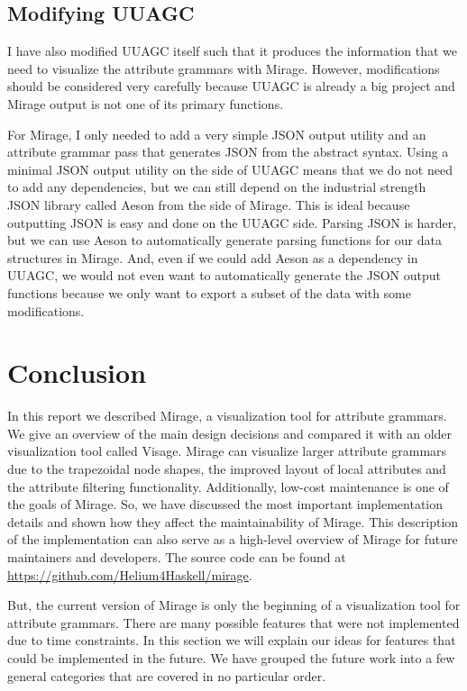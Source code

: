 \documentclass[11pt]{article}
\begin{document}
\subsection{Modifying UUAGC}

I have also modified UUAGC itself such that it produces the information that we need to visualize the attribute grammars with Mirage.
However, modifications should be considered very carefully because UUAGC is already a big project and Mirage output is not one of its primary functions.

For Mirage, I only needed to add a very simple JSON output utility and an attribute grammar pass that generates JSON from the abstract syntax.
Using a minimal JSON output utility on the side of UUAGC means that we do not need to add any dependencies, but we can still depend on the industrial strength JSON library called Aeson from the side of Mirage.
This is ideal because outputting JSON is easy and done on the UUAGC side.
Parsing JSON is harder, but we can use Aeson to automatically generate parsing functions for our data structures in Mirage.
And, even if we could add Aeson as a dependency in UUAGC, we would not even want to automatically generate the JSON output functions because we only want to export a subset of the data with some modifications.

\section{Conclusion}

In this report we described Mirage, a visualization tool for attribute grammars.
We give an overview of the main design decisions and compared it with an older visualization tool called Visage.
Mirage can visualize larger attribute grammars due to the trapezoidal node shapes, the improved layout of local attributes and the attribute filtering functionality.
Additionally, low-cost maintenance is one of the goals of Mirage.
So, we have discussed the most important implementation details and shown how they affect the maintainability of Mirage.
This description of the implementation can also serve as a high-level overview of Mirage for future maintainers and developers.
The source code can be found at \url{https://github.com/Helium4Haskell/mirage}.

But, the current version of Mirage is only the beginning of a visualization tool for attribute grammars. There are many possible features that were not implemented due to time constraints. In this section we will explain our ideas for features that could be implemented in the future. We have grouped the future work into a few general categories that are covered in no particular order.
\end{document}
